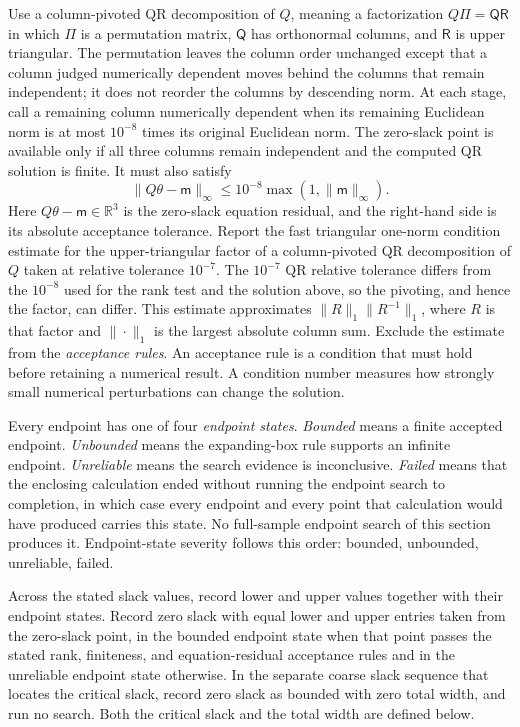 \documentclass[11pt]{article}
\begin{document}
Use a column-pivoted QR decomposition of \(Q\), meaning a factorization \(Q\Pi=\mathsf{QR}\) in which
\(\Pi\) is a permutation matrix, \(\mathsf Q\) has orthonormal columns, and
\(\mathsf R\) is upper triangular. The permutation leaves the column order unchanged except that a
column judged numerically dependent moves behind the columns that remain independent; it does not
reorder the columns by descending norm. At each stage, call a remaining column numerically
dependent when its remaining Euclidean norm is at most \(10^{-8}\) times its original Euclidean norm. The zero-slack point is available only if all
three columns remain independent and the computed QR solution is finite. It must also satisfy
\begin{equation*}
 \|Q\theta-\mathsf m\|_\infty\le10^{-8}\max(1,\|\mathsf m\|_\infty).
\end{equation*}
Here \(Q\theta-\mathsf m\in\mathbb R^3\) is the zero-slack equation residual, and the right-hand side is
its absolute acceptance tolerance. Report the fast triangular one-norm condition estimate for the
upper-triangular factor of a column-pivoted QR decomposition of \(Q\) taken at relative tolerance
\(10^{-7}\). The \(10^{-7}\) QR relative tolerance differs from the \(10^{-8}\) used for the rank test and the
solution above, so the pivoting, and hence the factor, can differ. This estimate approximates
\(\|R\|_1\|R^{-1}\|_1\), where \(R\) is that factor and \(\|\cdot\|_1\) is the largest absolute
column sum. Exclude the estimate from the \emph{acceptance rules}. An acceptance rule is a condition
that must hold before retaining a numerical result. A condition number measures how strongly small
numerical perturbations can change the solution.

Every endpoint has one of four \emph{endpoint states}. \emph{Bounded} means a finite accepted
endpoint. \emph{Unbounded} means the expanding-box rule supports an infinite endpoint.
\emph{Unreliable} means the search evidence is inconclusive. \emph{Failed} means that the enclosing
calculation ended without running the endpoint search to completion, in which case every endpoint and
every point that calculation would have produced carries this state. No full-sample endpoint search
of this section produces it. Endpoint-state severity follows this order: bounded,
unbounded, unreliable, failed.

Across the stated slack values, record lower and upper values together with their endpoint states.
Record zero slack with equal lower and upper entries taken from the zero-slack point, in the
bounded endpoint state when that point passes the stated rank, finiteness, and equation-residual
acceptance rules and in the unreliable endpoint state otherwise. In the separate coarse slack sequence that
locates the critical slack, record zero slack as bounded with zero total width, and run no search.
Both the critical slack and the total width are defined below.
\end{document}
